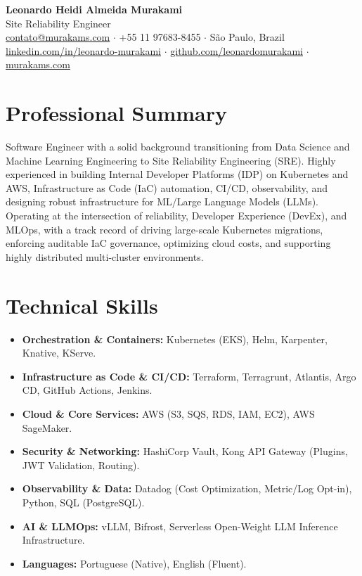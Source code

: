 \documentclass[10pt,a4paper]{article}
\begin{document}
\pagestyle{empty}

\begin{center}
    {\LARGE \bfseries \color{primary} Leonardo Heidi Almeida Murakami} \\
    \vspace{2pt}
    {\large \color{secondary} Site Reliability Engineer} \\
    \vspace{4pt}
    \small
    \href{mailto:contato@murakams.com}{contato@murakams.com} $\cdot$ +55 11 97683-8455 $\cdot$ São Paulo, Brazil \\
    \href{https://linkedin.com/in/leonardo-murakami}{linkedin.com/in/leonardo-murakami} $\cdot$ \href{https://github.com/leonardomurakami}{github.com/leonardomurakami} $\cdot$ \href{https://murakams.com}{murakams.com}
\end{center}

\vspace{6pt}

\section*{Professional Summary}
Software Engineer with a solid background transitioning from Data Science and Machine Learning Engineering to Site Reliability Engineering (SRE). Highly experienced in building Internal Developer Platforms (IDP) on Kubernetes and AWS, Infrastructure as Code (IaC) automation, CI/CD, observability, and designing robust infrastructure for ML/Large Language Models (LLMs). Operating at the intersection of reliability, Developer Experience (DevEx), and MLOps, with a track record of driving large-scale Kubernetes migrations, enforcing auditable IaC governance, optimizing cloud costs, and supporting highly distributed multi-cluster environments.

\section*{Technical Skills}
\begin{itemize}[leftmargin=*, noitemsep, topsep=0pt]
    \item \textbf{Orchestration \& Containers:} Kubernetes (EKS), Helm, Karpenter, Knative, KServe.
    \item \textbf{Infrastructure as Code \& CI/CD:} Terraform, Terragrunt, Atlantis, Argo CD, GitHub Actions, Jenkins.
    \item \textbf{Cloud \& Core Services:} AWS (S3, SQS, RDS, IAM, EC2), AWS SageMaker.
    \item \textbf{Security \& Networking:} HashiCorp Vault, Kong API Gateway (Plugins, JWT Validation, Routing).
    \item \textbf{Observability \& Data:} Datadog (Cost Optimization, Metric/Log Opt-in), Python, SQL (PostgreSQL).
    \item \textbf{AI \& LLMOps:} vLLM, Bifrost, Serverless Open-Weight LLM Inference Infrastructure.
    \item \textbf{Languages:} Portuguese (Native), English (Fluent).
\end{itemize}
\end{document}
